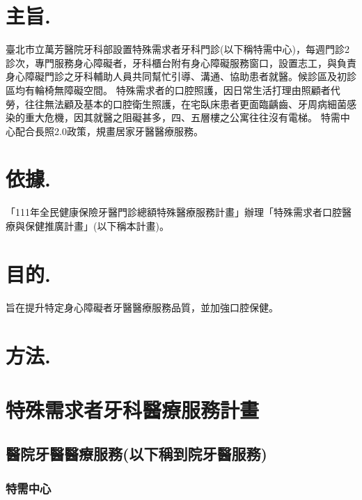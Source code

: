 \section*{主旨.}
臺北市立萬芳醫院牙科部設置特殊需求者牙科門診(以下稱特需中心)，每週門診2診次，專門服務身心障礙者，牙科櫃台附有身心障礙服務窗口，設置志工，與負責身心障礙門診之牙科輔助人員共同幫忙引導、溝通、協助患者就醫。候診區及初診區均有輪椅無障礙空間。
特殊需求者的口腔照護，因日常生活打理由照顧者代勞，往往無法顧及基本的口腔衛生照護，在宅臥床患者更面臨齲齒、牙周病細菌感染的重大危機，因其就醫之阻礙甚多，四、五層樓之公寓往往沒有電梯。
特需中心配合長照2.0政策，規畫居家牙醫醫療服務。

\section*{依據.}
「111年全民健康保險牙醫門診總額特殊醫療服務計畫」辦理「特殊需求者口腔醫療與保健推廣計畫」(以下稱本計畫)。

\section*{目的.} 旨在提升特定身心障礙者牙醫醫療服務品質，並加強口腔保健。

\section*{方法.}
\section{特殊需求者牙科醫療服務計畫}

\subsection{醫院牙醫醫療服務(以下稱到院牙醫服務)}
\label{dent}

\subsubsection{特需中心}

